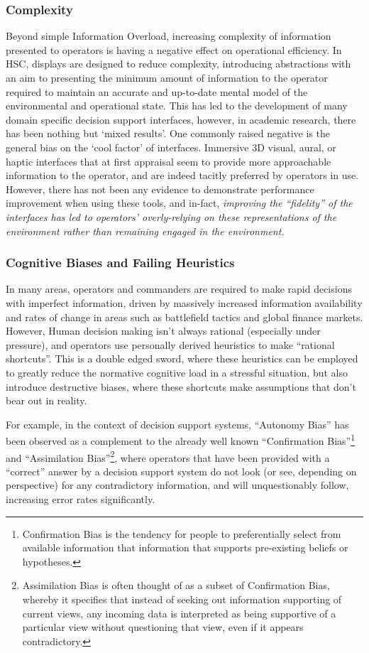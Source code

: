  \subsubsection{Complexity}
 Beyond simple Information Overload, increasing complexity of information presented to operators is having a negative effect on operational efficiency.
 In HSC, displays are designed to reduce complexity, introducing abstractions with an aim to presenting the minimum amount of information to the operator required to maintain an accurate and up-to-date mental model of the environmental and operational state.
 This has led to the development of many domain specific decision support interfaces, however, in academic research, there has been nothing but ‘mixed results’.
 One commonly raised negative is the general bias on the ‘cool factor’ of interfaces.
 Immersive 3D visual, aural, or haptic interfaces that at first appraisal seem to provide more approachable information to the operator, and are indeed tacitly preferred by operators in use.
 However, there has not been any evidence to demonstrate performance improvement when using these tools, and in-fact, \textit{improving the ``fidelity'' of the interfaces has led to operators’ overly-relying on these representations of the environment rather than remaining engaged in the environment.}
 
 \subsubsection{Cognitive Biases and Failing Heuristics}
 In many areas, operators and commanders are required to make rapid decisions with imperfect information, driven by massively increased information availability and rates of change in areas such as battlefield tactics and global finance markets.
 However, Human decision making isn’t always rational (especially under pressure), and operators use personally derived heuristics to make ``rational shortcuts''.
 This is a double edged sword, where these heuristics can be employed to greatly reduce the normative cognitive load in a stressful situation, but also introduce destructive biases, where these shortcuts make assumptions that don’t bear out in reality.
 
 For example, in the context of decision support systems, ``Autonomy Bias'' has been observed as a complement to the already well known ``Confirmation Bias''\footnote{Confirmation Bias is the tendency for people to preferentially select from available information that information that supports pre-existing beliefs or hypotheses.}  and ``Assimilation Bias''\footnote{Assimilation Bias is often thought of as a subset of Confirmation Bias, whereby it specifies that instead of seeking out information supporting of current views, any incoming data is interpreted as being supportive of a particular view without questioning that view, even if it appears contradictory.}, where operators that have been provided with a ``correct'' answer by a decision support system do not look (or see, depending on perspective) for any contradictory information, and will unquestionably follow, increasing error rates significantly.
 
